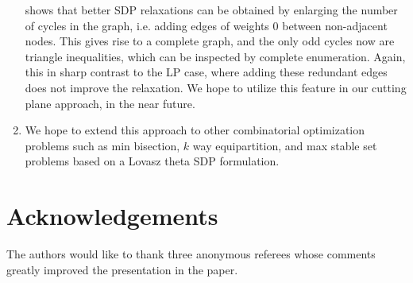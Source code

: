 \documentclass[12pt]{article}
\begin{document}
\begin{enumerate}
\cite{helmberg10} shows that better SDP relaxations can be
obtained by enlarging the number of cycles in the graph, i.e.
adding edges of weights $0$ between non-adjacent nodes. This gives
rise to a complete graph, and the only odd cycles now are triangle
inequalities, which can be inspected by complete enumeration.
Again, this in sharp contrast to the LP case, where adding these
redundant edges does not improve the relaxation. We hope to
utilize this feature in our cutting plane approach, in the near
future. \item We hope to extend this approach to other
combinatorial optimization problems such as min bisection, $k$ way
equipartition, and max stable set problems based on a Lovasz theta
SDP formulation.
\end{enumerate}

\section{Acknowledgements}
The authors would like to thank three anonymous referees whose
comments greatly improved the presentation in the paper.
\end{document}
